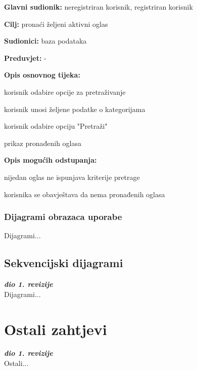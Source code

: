 					\noindent {}
					\begin{packed_item}
						
						\item \textbf{Glavni sudionik: } neregistriran korisnik, registriran korisnik
						\item  \textbf{Cilj:} pronaći željeni aktivni oglas
						\item  \textbf{Sudionici:} baza podataka
						\item  \textbf{Preduvjet:} -
						\item  \textbf{Opis osnovnog tijeka:}
						
						\item[] \begin{packed_enum}
							
							\item korisnik odabire opcije za pretraživanje
							\item korisnik unosi željene podatke o kategorijama
							\item korisnik odabire opciju "Pretraži"
							\item prikaz pronađenih oglasa
						\end{packed_enum}
						
						\item  \textbf{Opis mogućih odstupanja:}
						
						\item[] \begin{packed_item}
							
							\item[3.a] nijedan oglas ne ispunjava kriterije pretrage
							\item[] \begin{packed_enum}
								\item korisnika se obavještava da nema pronađenih oglasa
							\end{packed_enum}
							
						\end{packed_item}
					\end{packed_item}
				
					
				\subsubsection{Dijagrami obrazaca uporabe}
					
					Dijagrami...
				\eject		
				
			\subsection{Sekvencijski dijagrami}
				
				\textbf{\textit{dio 1. revizije}}\\
				
				Dijagrami...
				\eject
	
		\section{Ostali zahtjevi}
		
			\textbf{\textit{dio 1. revizije}}\\
		 
			Ostali...
			 
			 
			 
	